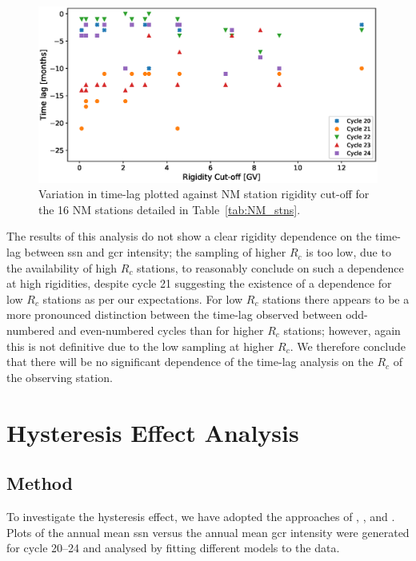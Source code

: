 \begin{figure}
	\includegraphics[width=\columnwidth]{rigidity_analysis.eps}
	\caption{Variation in time-lag plotted against NM station rigidity cut-off for the 16 NM stations detailed in Table~\ref{tab:NM_stns}.}
	\label{fig:time_lags_rigidity}
\end{figure}

The results of this analysis do not show a clear rigidity dependence on the time-lag between \gls{ssn} and \gls{gcr} intensity; the sampling of higher $R_c$ is too low, due to the availability of high $R_c$ stations, to reasonably conclude on such a dependence at high rigidities, despite cycle 21 suggesting the existence of a dependence for low $R_c$ stations as per our expectations. For low $R_c$ stations there appears to be a more pronounced distinction between the time-lag observed between odd-numbered and even-numbered cycles than for higher $R_c$ stations; however, again this is not definitive due to the low sampling at higher $R_c$. We therefore conclude that there will be no significant dependence of the time-lag analysis on the $R_c$ of the observing station.


\section{Hysteresis Effect Analysis}
\label{sec:hysteresis}


\subsection{Method}
\label{HA-Method} 

To investigate the hysteresis effect, we have adopted the approaches of \cite{van_allen_modulation_2000}, \cite{singh_solar_2008}, and \cite{inceoglu_modeling_2014}. Plots of the annual mean \gls{ssn} versus the annual mean \gls{gcr} intensity were generated for cycle 20--24 and analysed by fitting different models to the data.

